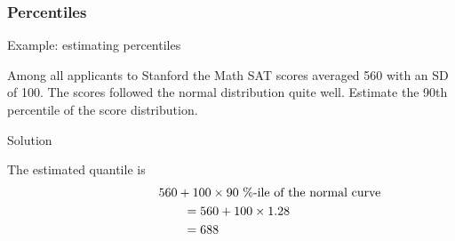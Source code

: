 \documentclass[handout]{beamer}
\begin{document}

   \begin{frame} \frametitle{Percentiles}

   \begin{block}
   {Example: estimating percentiles}

   Among all applicants to Stanford the Math SAT scores averaged 560 with
   an SD of 100. The scores followed the normal distribution
   quite well. Estimate the 90th percentile of the score distribution.

   \end{block}

   \begin{block}
     {Solution}

   The estimated quantile is
   $$
   \begin{aligned}
   \lefteqn{560 + 100 \times \text{90 \%-ile of the normal curve}} \\
   & \qquad =  560 + 100 \times 1.28 \\
   & \qquad = 688
   \end{aligned}
   $$
   \end{block}
   \end{frame}


   \begin{frame} 

   \end{frame}

   
\end{document}
